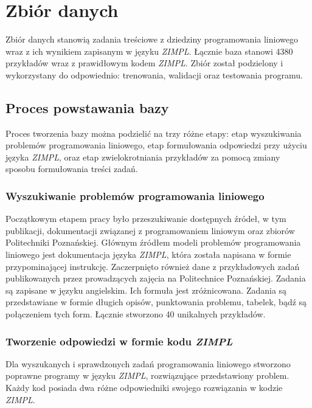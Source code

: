 
\chapter{Zbiór danych}\label{ch:dataset}

Zbiór danych stanowią zadania treściowe z dziedziny programowania liniowego wraz z ich wynikiem zapisanym w języku \textit{ZIMPL}. Łącznie baza stanowi 4380 przykładów wraz z prawidłowym kodem \textit{ZIMPL}. Zbiór został podzielony i wykorzystany do odpowiednio: trenowania, walidacji oraz testowania programu.

\section{Proces powstawania bazy}

Proces tworzenia bazy można podzielić na trzy różne etapy: etap wyszukiwania problemów programowania liniowego, etap formułowania odpowiedzi przy użyciu języka \textit{ZIMPL}, oraz etap zwielokrotniania przykładów za pomocą zmiany sposobu formułowania treści zadań.

\subsection{Wyszukiwanie problemów programowania liniowego}

Początkowym etapem pracy było przeszukiwanie dostępnych źródeł, w tym publikacji, dokumentacji związanej z programowaniem liniowym\cite{brilliant_linear}\cite{byjus_linear}\cite{cimt}\cite{arsdcollege2020}\cite{libretexts_linear}\cite{superprof_linear}\cite{toppr_graphical} oraz zbiorów Politechniki Poznańskiej. Głównym źródłem modeli problemów programowania liniowego jest dokumentacja języka  \textit{ZIMPL}, która została napisana w formie przypominającej instrukcję. Zaczerpnięto również dane z przykładowych zadań publikowanych przez prowadzących zajęcia na Politechnice Poznańskiej. Zadania są zapisane w języku angielskim. Ich formuła jest zróżnicowana. Zadania są przedstawiane w formie długich opisów, punktowania problemu, tabelek, bądź są połączeniem tych form. Łącznie stworzono 40 unikalnych przykładów.

\subsection{Tworzenie odpowiedzi w formie kodu  \textit{ZIMPL}}

Dla wyszukanych i sprawdzonych zadań programowania liniowego stworzono poprawne programy w języku  \textit{ZIMPL}, rozwiązujące przedstawiony problem. Każdy kod posiada dwa różne odpowiedniki swojego rozwiązania w kodzie  \textit{ZIMPL}. 

